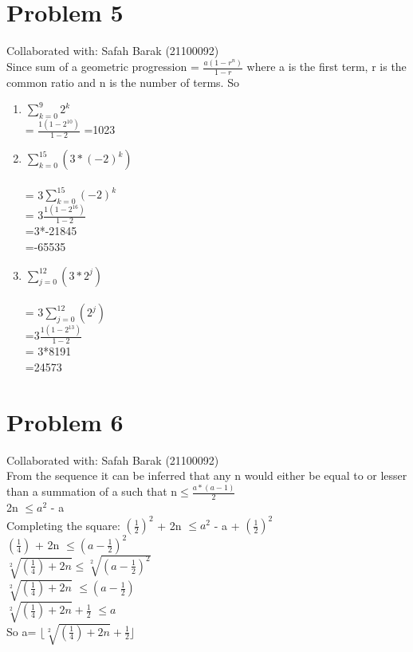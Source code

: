 \documentclass{article}
\begin{document}
\section{Problem 5}
Collaborated with: Safah Barak (21100092)\\
Since sum of a geometric progression =  $\frac{a(1-r^n)}{1-r}$ where a is the first term, r is the common ratio and n is the number of terms. So \\ 
\begin{enumerate}
\item %
 $\sum_{k=0}^{9} 2^k$ \\= $\frac{1(1-2^{10})}{1-2}$ =1023

\item %
 $\sum_{k=0}^{15} (3*(-2)^k)$ \\\\ = 3$\sum_{k=0}^{15} (-2)^k$ \\= 3$\frac{1(1-2^{16})}{1-2}$\\ =3*-21845\\=-65535

\item %
$\sum_{j=0}^{12} (3*2^j)$ \\\\ = 3$\sum_{j=0}^{12} (2^j)$ \\=3$\frac {1(1-2^{13})}{1-2}$ \\ = 3*8191 \\=24573 

\end{enumerate}

\section{Problem 6}
Collaborated with: Safah Barak (21100092)\\
From the sequence it can be inferred that any n would either be equal to or lesser than a summation of a such that n$\leq \frac{a*(a-1)}{2}$\\ 2n $\leq a^{2}$ - a \\ Completing the square: $(\frac{1}{2})^{2}$ + 2n $\leq a^{2}$ - a + $(\frac{1}{2})^{2}$ \\  $(\frac{1}{4})$ + 2n $\leq (a - \frac{1}{2})^{2}$ \\$\sqrt[2]{(\frac{1}{4}) + 2n} $$\leq \sqrt[2]{(a - \frac{1}{2})^{2}}$ \\ $ \sqrt[2]{(\frac{1}{4}) + 2n}$ $\leq(a - \frac{1}{2})$ \\ $ \sqrt[2]{(\frac{1}{4}) + 2n}+ \frac{1}{2} $ $\leq a $ \\ So a= $\lfloor \sqrt[2]{(\frac{1}{4}) + 2n}+ \frac{1}{2} \rfloor$ 
\end{document}
